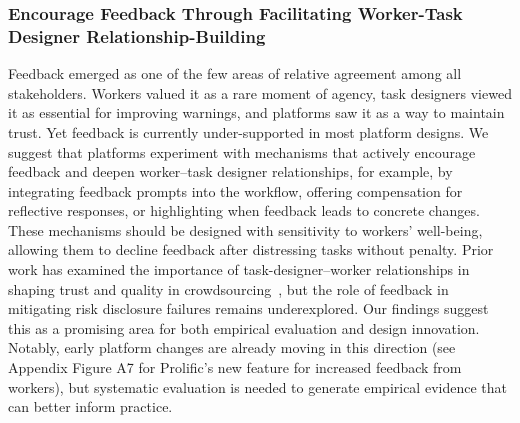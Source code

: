 \subsubsection{Encourage Feedback Through Facilitating Worker-Task Designer Relationship-Building}
Feedback emerged as one of the few areas of relative agreement among all stakeholders. Workers valued it as a rare moment of agency, task designers viewed it as essential for improving warnings, and platforms saw it as a way to maintain trust. Yet feedback is currently under-supported in most platform designs. We suggest that platforms experiment with mechanisms that actively encourage feedback and deepen worker–task designer relationships, for example, by integrating feedback prompts into the workflow, offering compensation for reflective responses, or highlighting when feedback leads to concrete changes. These mechanisms should be designed with sensitivity to workers’ well-being, allowing them to decline feedback after distressing tasks without penalty. Prior work has examined the importance of task-designer–worker relationships in shaping trust and quality in crowdsourcing~\cite{irani2013turkopticon, qian2025locating}, but the role of feedback in mitigating risk disclosure failures remains underexplored. Our findings suggest this as a promising area for both empirical evaluation and design innovation. Notably, early platform changes are already moving in this direction (see Appendix Figure A7 for Prolific's new feature for increased feedback from workers), but systematic evaluation is needed to generate empirical evidence that can better inform practice. 

